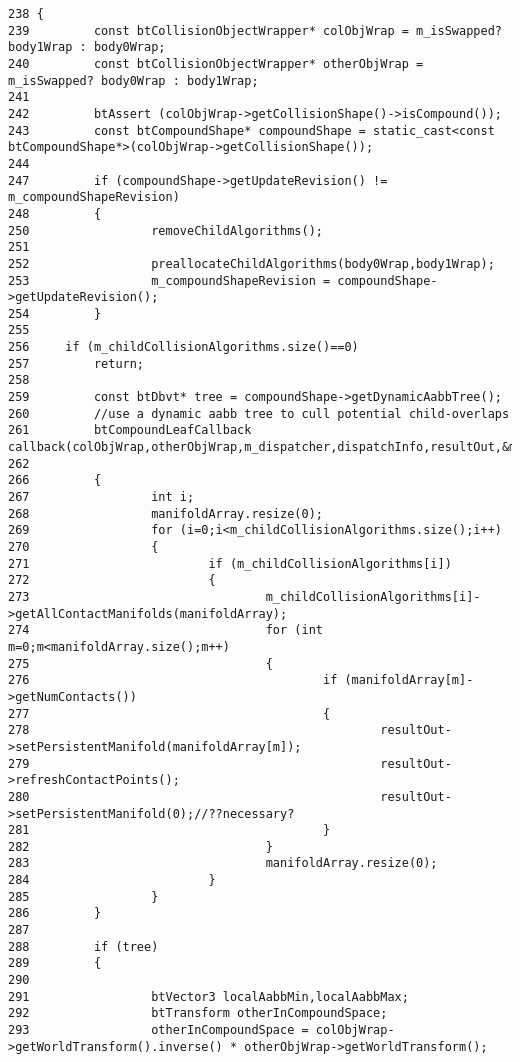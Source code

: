 \begin{Code}\begin{verbatim}238 {
239         const btCollisionObjectWrapper* colObjWrap = m_isSwapped? body1Wrap : body0Wrap;
240         const btCollisionObjectWrapper* otherObjWrap = m_isSwapped? body0Wrap : body1Wrap;
241 
242         btAssert (colObjWrap->getCollisionShape()->isCompound());
243         const btCompoundShape* compoundShape = static_cast<const btCompoundShape*>(colObjWrap->getCollisionShape());
244 
247         if (compoundShape->getUpdateRevision() != m_compoundShapeRevision)
248         {
250                 removeChildAlgorithms();
251                 
252                 preallocateChildAlgorithms(body0Wrap,body1Wrap);
253                 m_compoundShapeRevision = compoundShape->getUpdateRevision();
254         }
255 
256     if (m_childCollisionAlgorithms.size()==0)
257         return;
258     
259         const btDbvt* tree = compoundShape->getDynamicAabbTree();
260         //use a dynamic aabb tree to cull potential child-overlaps
261         btCompoundLeafCallback  callback(colObjWrap,otherObjWrap,m_dispatcher,dispatchInfo,resultOut,&m_childCollisionAlgorithms[0],m_sharedManifold);
262 
266         {
267                 int i;
268                 manifoldArray.resize(0);
269                 for (i=0;i<m_childCollisionAlgorithms.size();i++)
270                 {
271                         if (m_childCollisionAlgorithms[i])
272                         {
273                                 m_childCollisionAlgorithms[i]->getAllContactManifolds(manifoldArray);
274                                 for (int m=0;m<manifoldArray.size();m++)
275                                 {
276                                         if (manifoldArray[m]->getNumContacts())
277                                         {
278                                                 resultOut->setPersistentManifold(manifoldArray[m]);
279                                                 resultOut->refreshContactPoints();
280                                                 resultOut->setPersistentManifold(0);//??necessary?
281                                         }
282                                 }
283                                 manifoldArray.resize(0);
284                         }
285                 }
286         }
287 
288         if (tree)
289         {
290 
291                 btVector3 localAabbMin,localAabbMax;
292                 btTransform otherInCompoundSpace;
293                 otherInCompoundSpace = colObjWrap->getWorldTransform().inverse() * otherObjWrap->getWorldTransform();

\end{verbatim}
\end{Code}
